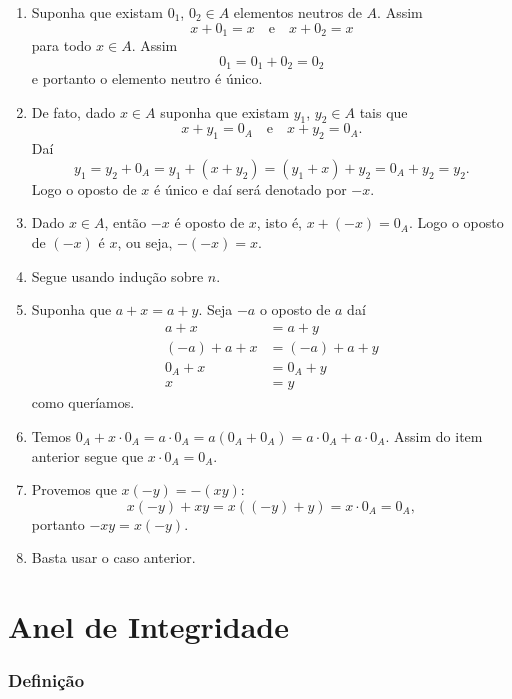 \begin{prova}
	\begin{enumerate}[label={\roman*})]
		\item Suponha que existam $0_1$, $0_2\in A$ elementos neutros de $A$. Assim
		\[
			x + 0_1 = x \quad \mbox{e}\quad x + 0_2 = x	
		\]
		para todo $x \in A$. Assim
		\[
			0_1 = 0_1 + 0_2 = 0_2
		\]
		e portanto o elemento neutro é único.

		\item De fato, dado $x \in A$ suponha que existam $y_1$, $y_2\in A$ tais que
		\[
			x + y_1 = 0_A \quad \mbox{e}\quad x + y_2 = 0_A.
		\]
		Daí
		\[
			y_1 = y_2 + 0_A = y_1 + (x + y_2) = (y_1 + x) + y_2 = 0_A + y_2 =y_2.
		\]
		Logo o oposto de $x$ é único  e daí será denotado por $-x$.
		
		\item Dado $x \in A$, então $-x$ {\'e} oposto de $x$, isto {\'e}, $x + (-x) = 0_A$. Logo o oposto de $(-x)$ {\'e} $x$, ou seja, $-(-x) = x$.

		\item Segue usando indução sobre $n$.

		\item Suponha que $a + x = a + y$. Seja $-a$ o oposto de $a$ daí
		\begin{align*}
			a + x &= a + y\\
			(-a) + a + x &= (-a) + a + y\\
			0_A + x &= 0_A + y\\
			x & = y
		\end{align*}
		como queríamos.

		\item Temos $0_A + x\cdot 0_A = a\cdot 0_A = a(0_A + 0_A) = a\cdot 0_A + a\cdot 0_A$. Assim do item anterior segue que $x\cdot 0_A = 0_A$.

		\item Provemos que $x(-y) = -(xy)$:
		\[
			x(-y) + xy = x((-y) + y) = x\cdot 0_A = 0_A,
		\]
		portanto $-xy = x(-y)$.

		\item Basta usar o caso anterior.
	\end{enumerate}
\end{prova}

\section{Anel de Integridade}
\subsubsection{Defini{\c c}{\~a}o}

